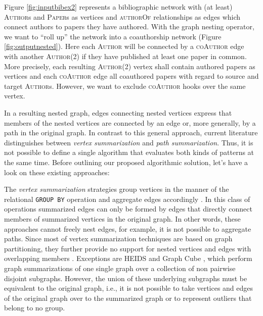 \begin{ex}[label=ex1]
Figure \ref{fig:inputbibex2} represents a bibliographic network with (at least) \textsc{Author}s and \textsc{Paper}s as vertices and \textsc{authorOf} relationships as edges which connect authors to papers they have authored. With the graph nesting operator, we want to ``roll up'' the network into a coauthorship network (Figure \ref{fig:outputnested}). Here each \textsc{Author} will be connected by a \textsc{coAuthor} edge with another \textsc{Author}(2) if they have published at least one paper in common.
More precisely, each resulting \textsc{Author}(2) vertex shall contain authored papers as vertices and each \textsc{coAuthor} edge all coauthored papers with regard to source and target \textsc{Author}s. However, we want to exclude \textsc{coAuthor} hooks over the same vertex.
\end{ex}

In a resulting nested graph, edges connecting nested vertices express that members of the nested vertices are connected by an edge or, more generally, by a path in the original graph.
In contrast to this general approach, current literature distinguishes between \textit{vertex summarization} and \textit{path summarization}. Thus, it is not possible to define a single algorithm that evaluates both kinds of patterns at the same time. Before outlining our proposed algorithmic solution, let's have a look on these existing approaches:

The \textit{vertex summarization} strategies group vertices in the manner of the relational \texttt{GROUP BY} operation and aggregate edges accordingly \cite{JunghannsPR17}. In this class of operations summarized edges can only be formed by edges that directly connect members of summarized vertices in the original graph. In other words, these approaches cannot freely nest edges, for example, it is not possible to aggregate paths. Since most of vertex summarization techniques are based on graph partitioning, they further provide no support for nested vertices and edges with overlapping members \cite{yin,Tian20085,jakawat}.
Exceptions are HEIDS \cite{ChengJQ16} and Graph Cube \cite{Zhao11}, which perform graph summarizations of one single graph over a collection of non pairwise disjoint subgraphs. However, the union of these underlying subgraphs must be equivalent to the original graph, i.e., it is not possible to take vertices and edges of the original graph over to the summarized graph or to represent outliers that belong to no group.

